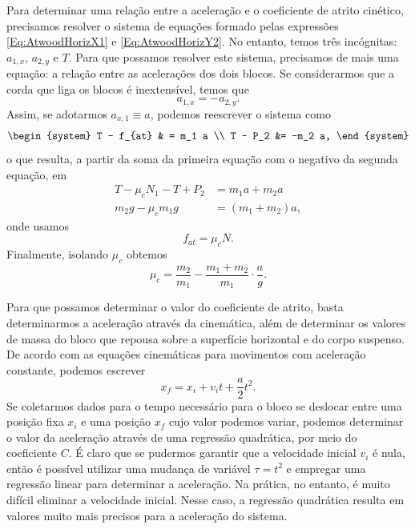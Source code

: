 Para determinar uma relação entre a aceleração e o coeficiente de atrito cinético, precisamos resolver o sistema de equações formado pelas expressões \eqref{Eq:AtwoodHorizX1} e \eqref{Eq:AtwoodHorizY2}. No entanto, temos três incógnitas: $a_{1,x}$, $a_{2,y}$ e $T$. Para que possamos resolver este sistema, precisamos de mais uma equação: a relação entre as acelerações dos dois blocos. Se considerarmos que a corda que liga os blocos é inextensível, temos que
\begin{equation}
a_{1,x} = - a_{2,y}.
\end{equation}
%
Assim, se adotarmos $a_{x, 1} \equiv a$, podemos reescrever o sistema como
\begin{equation}
\begin{system}
T - f_{at} & = m_1 a \\
T - P_2 &= -m_2 a,
\end{system}
\end{equation}
%
o que resulta, a partir da soma da primeira equação com o negativo da segunda equação, em
\begin{align}
    T - \mu_c N_1 - T + P_2 &= m_1 a + m_2 a \\
    m_2 g - \mu_c m_1 g &= (m_1 + m_2) a,
\end{align}
%
onde usamos
\begin{equation}
    f_{at} = \mu_c N.
\end{equation}
%
Finalmente, isolando $\mu_c$ obtemos
\begin{equation}\label{Eq:CoefAtritoCineticoAtravesDaAceleracao}
    \mu_c = \frac{m_2}{m_1} - \frac{m_1 + m_2}{m_1} \cdot\frac{a}{g}.
\end{equation}

Para que possamos determinar o valor do coeficiente de atrito, basta determinarmos a aceleração através da cinemática, além de determinar os valores de massa do bloco que repousa sobre a superfície horizontal e do corpo suspenso. De acordo com as equações cinemáticas para movimentos com aceleração constante, podemos escrever
\begin{equation}
    x_f = x_i + v_i t + \frac{a}{2} t^2.
\end{equation}
%
Se coletarmos dados para o tempo necessário para o bloco se deslocar entre uma posição fixa $x_i$ e uma posição $x_f$ cujo valor podemos variar, podemos determinar o valor da aceleração através de uma regressão quadrática, por meio do coeficiente $C$. É claro que se pudermos garantir que a velocidade inicial $v_i$ é nula, então é possível utilizar uma mudança de variável $\tau = t^2$ e empregar uma regressão linear para determinar a aceleração. Na prática, no entanto, é muito difícil eliminar a velocidade inicial. Nesse caso, a regressão quadrática resulta em valores muito mais precisos para a aceleração do sistema.

